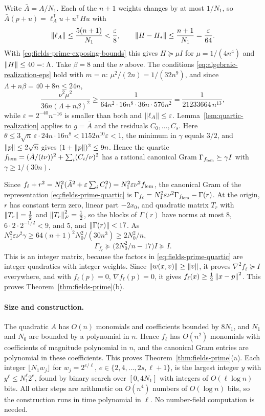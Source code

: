 Write $\bar A=A/N_1$. Each of the $n+1$ weights changes by at most $1/N_1$,
so $\bar A(p+u)=\ell_A^{\mathsf T}u+u^{\mathsf T}Hu$ with
\[
 \left\lVert\ell_A\right\rVert\le\frac{5(n+1)}{N_1}<\frac\varepsilon8,\qquad
 \left\lVert H-H_*\right\rVert\le\frac{n+1}{N_1}=\frac\varepsilon{64}.
\]
With \eqref{eq:fields-prime-exposing-bounds} this gives $H\succeq\mu I$ for
$\mu=1/(4n^4)$ and $\left\lVert H\right\rVert\le40=:\Lambda$. Take $\beta=8$ and the $\nu$
above. The conditions \eqref{eq:algebraic-realization-eps} hold with $m=n$:
$\mu^2/(2n)=1/(32n^9)$, and since $\Lambda+n\beta=40+8n\le24n$,
\[
 \frac{\nu^2\mu^2}{36n(\Lambda+n\beta)^2}
 \ge\frac1{64n^2\cdot16n^8\cdot36n\cdot576n^2}=\frac1{21233664\,n^{13}},
\]
while $\varepsilon=2^{-40}n^{-16}$ is smaller than both and
$\left\lVert\ell_A\right\rVert\le\varepsilon$. Lemma~\ref{lem:quartic-realization} applies to
$g=\bar A$ and the residuals $C_0,\ldots,C_s$. Here
$\theta\le3\sqrt n\,\varepsilon\cdot24n\cdot16n^8<1152n^{10}\varepsilon<1$,
the minimum in $\gamma$ equals $3/2$, and $\left\lVert p\right\rVert\le2\sqrt n$ gives
$(1+\left\lVert p\right\rVert)^2\le9n$. Hence the quartic
$f_{\rm lem}=(\bar A/(t\nu))^2+\sum_i(C_i/\nu)^2$ has a rational canonical Gram
$\Gamma_{f_{\rm lem}}\succeq\gamma I$ with $\gamma\ge1/(30n)$.

Since $f_\ell+r^2=N_1^2(\bar A^2+\varepsilon\sum_iC_i^2)
=N_1^2\varepsilon\nu^2f_{\rm lem}$, the canonical Gram of the representation
\eqref{eq:fields-prime-quartic} is
$\Gamma_{f_\ell}=N_1^2\varepsilon\nu^2\Gamma_{f_{\rm lem}}-\Gamma(r)$. At the
origin, $r$ has constant term zero, linear part $-2x_0$, and quadratic matrix
$T_r$ with $\left\lVert T_r\right\rVert=\frac12$ and $\left\lVert T_r\right\rVert_F^2=\frac12$, so the blocks of
$\Gamma(r)$ have norms at most $8$, $6\cdot2\cdot2^{-1/2}<9$, and $5$, and
$\left\lVert\Gamma(r)\right\rVert<17$. As
$N_1^2\varepsilon\nu^2\gamma\ge64(n+1)^2N_0^2/(30n^3)\ge2N_0^2/n$,
\[
 \Gamma_{f_\ell}\succeq\bigl(2N_0^2/n-17\bigr)I\succeq I .
\]
This is an integer matrix, because the factors in
\eqref{eq:fields-prime-quartic} are integer quadratics with integer weights.
Since $\left\lVert w(x,v)\right\rVert\ge\left\lVert v\right\rVert$, it proves $\nabla^2f_\ell\succeq I$
everywhere, and with $f_\ell(p)=0$, $\nabla f_\ell(p)=0$, it gives
$f_\ell(x)\ge\frac12\left\lVert x-p\right\rVert^2$. This proves
Theorem~\ref{thm:fields-prime}(b).

\paragraph{Size and construction.}
The quadratic $A$ has $O(n)$ monomials and coefficients bounded by $8N_1$,
and $N_1$ and $N_0$ are bounded by a polynomial in $n$. Hence $f_\ell$ has
$O(n^2)$ monomials with coefficients of magnitude polynomial in $n$, and the
canonical Gram entries are polynomial in these coefficients. This proves
Theorem~\ref{thm:fields-prime}(a). Each integer $\lfloor N_1w_j\rfloor$ for
$w_j=2^{e/\ell}$, $e\in\{2,4,\ldots,2s,\ell+1\}$, is the largest integer $y$
with $y^\ell\le N_1^\ell2^e$, found by binary search over $[0,4N_1]$ with
integers of $O(\ell\log n)$ bits. All other steps are arithmetic on $O(n^4)$
numbers of $O(\log n)$ bits, so the construction runs in time polynomial in
$\ell$. No number-field computation is needed.

